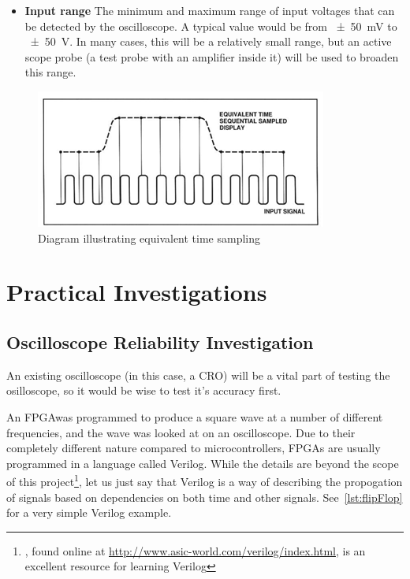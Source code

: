 \begin{itemize}
  \item \textbf{Input range} The minimum and maximum range of input voltages
    that can be detected by the oscilloscope. A typical value would be from
    \SI{\pm 50}{\mV} to \SI{\pm 50}{\V}. In many cases, this will be a
    relatively small range, but an active scope probe (a test probe with an
    amplifier inside it) will be used to broaden this range.

\end{itemize}

\begin{figure}
  \centering
  \includegraphics{img/equivalent_time_sampling.png}
  \caption[Equivalent Time Sampling Diagram]{Diagram illustrating equivalent time sampling ~\autocite{EquivalentTimeSampling}}
  \label{fig:EquivalentTimeSampling}
\end{figure}

\section{Practical Investigations}

\subsection{Oscilloscope Reliability Investigation}
\label{sec:oscilloscopeReliabilityInvestigation}

An existing oscilloscope (in this case, a CRO) will be a vital part of testing
the osilloscope, so it would be wise to test it's accuracy first.

An FPGA\fdeffpga was programmed to produce a square wave at a number of
different frequencies, and the wave was looked at on an oscilloscope. Due to
their completely different nature compared to microcontrollers, FPGAs are
usually programmed in a language called Verilog. While the details are beyond
the scope of this project\footnote{\textcite{VerilogTutorial}, found online at
\url{http://www.asic-world.com/verilog/index.html}, is an excellent resource for
learning Verilog}, let us just say that Verilog is a way of describing the
propogation of signals based on dependencies on both time and other
signals\autocite{VerilogWiki}. See~\cref{lst:flipFlop} for a very simple Verilog
example.

